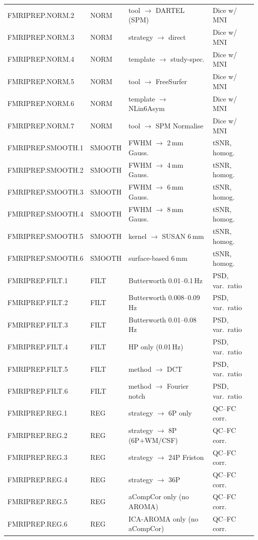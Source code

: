 \documentclass[11pt,a4paper]{article}
\begin{document}
\begin{longtable}{@{}llll@{}}
FMRIPREP.NORM.2 & NORM & tool $\to$ DARTEL (SPM)   & Dice w/ MNI \\
FMRIPREP.NORM.3 & NORM & strategy $\to$ direct      & Dice w/ MNI \\
FMRIPREP.NORM.4 & NORM & template $\to$ study-spec. & Dice w/ MNI \\
FMRIPREP.NORM.5 & NORM & tool $\to$ FreeSurfer      & Dice w/ MNI \\
FMRIPREP.NORM.6 & NORM & template $\to$ NLin6Asym   & Dice w/ MNI \\
FMRIPREP.NORM.7 & NORM & tool $\to$ SPM Normalise   & Dice w/ MNI \\
\midrule
FMRIPREP.SMOOTH.1 & SMOOTH & FWHM $\to$ 2\,mm Gauss. & tSNR, homog. \\
FMRIPREP.SMOOTH.2 & SMOOTH & FWHM $\to$ 4\,mm Gauss. & tSNR, homog. \\
FMRIPREP.SMOOTH.3 & SMOOTH & FWHM $\to$ 6\,mm Gauss. & tSNR, homog. \\
FMRIPREP.SMOOTH.4 & SMOOTH & FWHM $\to$ 8\,mm Gauss. & tSNR, homog. \\
FMRIPREP.SMOOTH.5 & SMOOTH & kernel $\to$ SUSAN 6\,mm & tSNR, homog. \\
FMRIPREP.SMOOTH.6 & SMOOTH & surface-based 6\,mm      & tSNR, homog. \\
\midrule
FMRIPREP.FILT.1 & FILT & Butterworth 0.01--0.1\,Hz  & PSD, var.\ ratio \\
FMRIPREP.FILT.2 & FILT & Butterworth 0.008--0.09\,Hz & PSD, var.\ ratio \\
FMRIPREP.FILT.3 & FILT & Butterworth 0.01--0.08\,Hz & PSD, var.\ ratio \\
FMRIPREP.FILT.4 & FILT & HP only (0.01\,Hz)         & PSD, var.\ ratio \\
FMRIPREP.FILT.5 & FILT & method $\to$ DCT           & PSD, var.\ ratio \\
FMRIPREP.FILT.6 & FILT & method $\to$ Fourier notch & PSD, var.\ ratio \\
\midrule
FMRIPREP.REG.1  & REG & strategy $\to$ 6P only      & QC--FC corr. \\
FMRIPREP.REG.2  & REG & strategy $\to$ 8P (6P+WM/CSF) & QC--FC corr. \\
FMRIPREP.REG.3  & REG & strategy $\to$ 24P Friston  & QC--FC corr. \\
FMRIPREP.REG.4  & REG & strategy $\to$ 36P          & QC--FC corr. \\
FMRIPREP.REG.5  & REG & aCompCor only (no AROMA)    & QC--FC corr. \\
FMRIPREP.REG.6  & REG & ICA-AROMA only (no aCompCor) & QC--FC corr. \\

\end{longtable}
\end{document}
